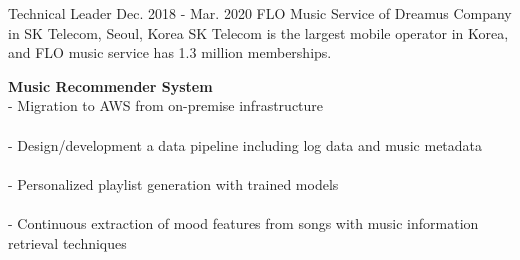 \begin{cventries}
    \cventry
        {Technical Leader} %
        {Dec. 2018 - Mar. 2020} %
        {FLO Music Service of Dreamus Company in SK Telecom, } %
        {Seoul, Korea}%
        { %
            SK Telecom is the largest mobile operator in Korea, and FLO music service has 1.3 million memberships.
        }
        { %
            \begin{cvitems}
                \item {
                    {\bf Music Recommender System} \\
                    - Migration to AWS from on-premise infrastructure \\
                         \\
                    - Design/development a data pipeline including log data and music metadata \\
                         \\
                    - Personalized playlist generation with trained models \\
                         \\
                    - Continuous extraction of mood features from songs with music information retrieval techniques \\
                         \nn
                }
            \end{cvitems}
        }


\end{cventries}
